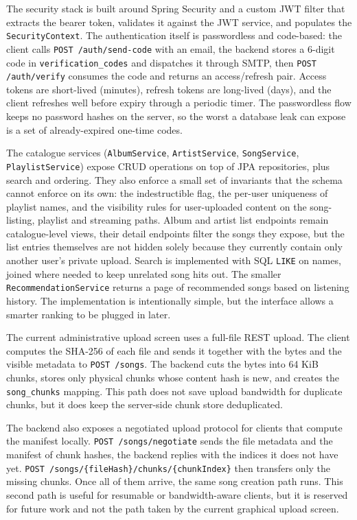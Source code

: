 \indent \par The security stack is built around Spring Security and a custom JWT filter that extracts the bearer token, validates it against the JWT service, and populates the \texttt{SecurityContext}. The authentication itself is passwordless and code-based: the client calls \texttt{POST /auth/send-code} with an email, the backend stores a 6-digit code in \texttt{verification\_codes} and dispatches it through SMTP, then \texttt{POST /auth/verify} consumes the code and returns an access/refresh pair. Access tokens are short-lived (minutes), refresh tokens are long-lived (days), and the client refreshes well before expiry through a periodic timer. The passwordless flow keeps no password hashes on the server, so the worst a database leak can expose is a set of already-expired one-time codes.

\indent \par The catalogue services (\texttt{AlbumService}, \texttt{ArtistService}, \texttt{SongService}, \texttt{PlaylistService}) expose CRUD operations on top of JPA repositories, plus search and ordering. They also enforce a small set of invariants that the schema cannot enforce on its own: the indestructible flag, the per-user uniqueness of playlist names, and the visibility rules for user-uploaded content on the song-listing, playlist and streaming paths. Album and artist list endpoints remain catalogue-level views, their detail endpoints filter the songs they expose, but the list entries themselves are not hidden solely because they currently contain only another user's private upload. Search is implemented with SQL \texttt{LIKE} on names, joined where needed to keep unrelated song hits out. The smaller \texttt{RecommendationService} returns a page of recommended songs based on listening history. The implementation is intentionally simple, but the interface allows a smarter ranking to be plugged in later.

\indent \par The current administrative upload screen uses a full-file REST upload. The client computes the SHA-256 of each file and sends it together with the bytes and the visible metadata to \texttt{POST /songs}. The backend cuts the bytes into 64 KiB chunks, stores only physical chunks whose content hash is new, and creates the \texttt{song\_chunks} mapping. This path does not save upload bandwidth for duplicate chunks, but it does keep the server-side chunk store deduplicated.

\par The backend also exposes a negotiated upload protocol for clients that compute the manifest locally. \texttt{POST /songs/negotiate} sends the file metadata and the manifest of chunk hashes, the backend replies with the indices it does not have yet. \texttt{POST /songs/\{fileHash\}/chunks/\{chunkIndex\}} then transfers only the missing chunks. Once all of them arrive, the same song creation path runs. This second path is useful for resumable or bandwidth-aware clients, but it is reserved for future work and not the path taken by the current graphical upload screen.

